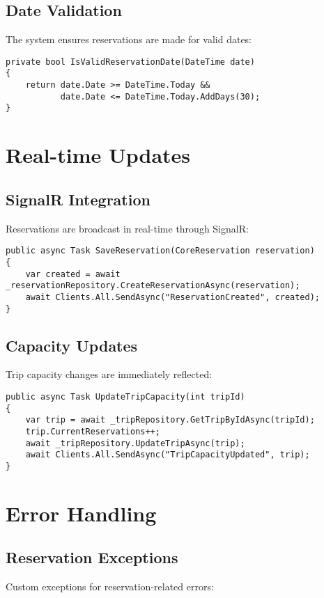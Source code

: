 \subsection{Date Validation}
The system ensures reservations are made for valid dates:

\begin{lstlisting}[language=CSharp]
private bool IsValidReservationDate(DateTime date)
{
    return date.Date >= DateTime.Today && 
           date.Date <= DateTime.Today.AddDays(30);
}
\end{lstlisting}

\section{Real-time Updates}

\subsection{SignalR Integration}
Reservations are broadcast in real-time through SignalR:

\begin{lstlisting}[language=CSharp]
public async Task SaveReservation(CoreReservation reservation)
{
    var created = await _reservationRepository.CreateReservationAsync(reservation);
    await Clients.All.SendAsync("ReservationCreated", created);
}
\end{lstlisting}

\subsection{Capacity Updates}
Trip capacity changes are immediately reflected:

\begin{lstlisting}[language=CSharp]
public async Task UpdateTripCapacity(int tripId)
{
    var trip = await _tripRepository.GetTripByIdAsync(tripId);
    trip.CurrentReservations++;
    await _tripRepository.UpdateTripAsync(trip);
    await Clients.All.SendAsync("TripCapacityUpdated", trip);
}
\end{lstlisting}

\section{Error Handling}

\subsection{Reservation Exceptions}
Custom exceptions for reservation-related errors:

